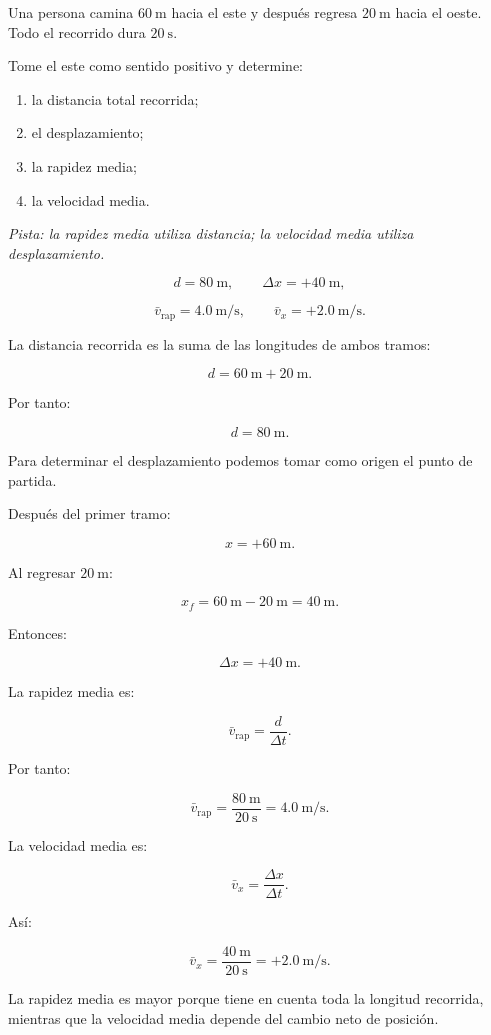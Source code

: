\begin{ejercicio}
Una persona camina \(\SI{60}{\meter}\) hacia el este y después regresa \(\SI{20}{\meter}\) hacia el oeste. Todo el recorrido dura \(\SI{20}{\second}\).

Tome el este como sentido positivo y determine:

\begin{enumerate}[label=\alph*)]
    \item la distancia total recorrida;
    \item el desplazamiento;
    \item la rapidez media;
    \item la velocidad media.
\end{enumerate}

\textit{Pista: la rapidez media utiliza distancia; la velocidad media utiliza desplazamiento.}
\end{ejercicio}

\begin{respuesta}
\[
d=\SI{80}{\meter},
\qquad
\Delta x=+\SI{40}{\meter},
\]

\[
\bar{v}_{\mathrm{rap}}=\SI{4.0}{\meter\per\second},
\qquad
\bar{v}_x=+\SI{2.0}{\meter\per\second}.
\]
\end{respuesta}

\begin{explicacion}
La distancia recorrida es la suma de las longitudes de ambos tramos:

\[
d
=
\SI{60}{\meter}
+
\SI{20}{\meter}.
\]

Por tanto:

\[ \boxed{d=\SI{80}{\meter}}. \]

Para determinar el desplazamiento podemos tomar como origen el punto de partida.

Después del primer tramo:

\[ x=+\SI{60}{\meter}. \]

Al regresar \(\SI{20}{\meter}\):

\[
x_f
=
\SI{60}{\meter}
-
\SI{20}{\meter}
=
\SI{40}{\meter}.
\]

Entonces:

\[ \boxed{\Delta x=+\SI{40}{\meter}}. \]

La rapidez media es:

\[ \bar{v}_{\mathrm{rap}}=\frac{d}{\Delta t}. \]

Por tanto:

\[
\bar{v}_{\mathrm{rap}}
=
\frac{\SI{80}{\meter}}
{\SI{20}{\second}}
=
\boxed{\SI{4.0}{\meter\per\second}}.
\]

La velocidad media es:

\[ \bar{v}_x=\frac{\Delta x}{\Delta t}. \]

Así:

\[
\bar{v}_x
=
\frac{\SI{40}{\meter}}
{\SI{20}{\second}}
=
\boxed{+\SI{2.0}{\meter\per\second}}.
\]

La rapidez media es mayor porque tiene en cuenta toda la longitud recorrida, mientras que la velocidad media depende del cambio neto de posición.
\end{explicacion}


